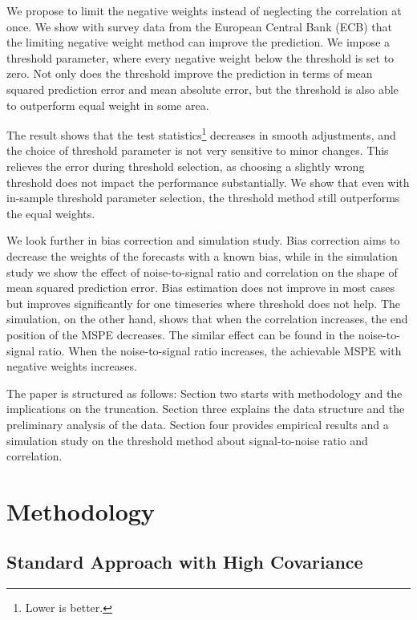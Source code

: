 \documentclass[11pt]{article}
\let\rmarkdownfootnote\footnote%
\def\footnote{\protect\rmarkdownfootnote}
\begin{document}
We propose to limit the negative weights instead of neglecting the correlation at once. We show with survey data from the European Central Bank (ECB) that the limiting negative weight method can improve the prediction. We impose a threshold parameter, where every negative weight below the threshold is set to zero. Not only does the threshold improve the prediction in terms of mean squared prediction error and mean absolute error, but the threshold is also able to outperform equal weight in some area.

The result shows that the test statistics\footnote{Lower is better.} decreases in smooth adjustments, and the choice of threshold parameter is not very sensitive to minor changes. This relieves the error during threshold selection, as choosing a slightly wrong threshold does not impact the performance substantially. We show that even with in-sample threshold parameter selection, the threshold method still outperforms the equal weights.

We look further in bias correction and simulation study. Bias correction aims to decrease the weights of the forecasts with a known bias, while in the simulation study we show the effect of noise-to-signal ratio and correlation on the shape of mean squared prediction error. Bias estimation does not improve in most cases but improves significantly for one timeseries where threshold does not help. The simulation, on the other hand, shows that when the correlation increases, the end position of the MSPE decreases. The similar effect can be found in the noise-to-signal ratio. When the noise-to-signal ratio increases, the achievable MSPE with negative weights increases.

The paper is structured as follows: Section two starts with methodology and the implications on the truncation. Section three explains the data structure and the preliminary analysis of the data. Section four provides empirical results and a simulation study on the threshold method about signal-to-noise ratio and correlation.


\section{Methodology}\label{methodology}

\subsection{Standard Approach with High Covariance}\label{standard-approach}
\end{document}
